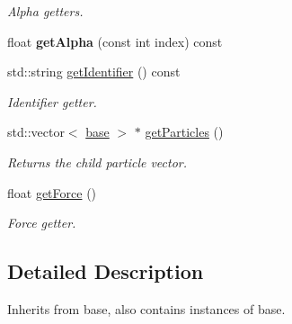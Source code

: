 \begin{DoxyCompactItemize}
\begin{DoxyCompactList}\small\item\em Alpha getters. \end{DoxyCompactList}\item 
\hypertarget{classpfx_af2cdb7ea2176235eba7a3b4af8b05ed7}{float {\bfseries get\-Alpha} (const int index) const }\label{classpfx_af2cdb7ea2176235eba7a3b4af8b05ed7}

\item 
\hypertarget{classpfx_aaa8626d7c9ec5d701fd4d953333f3473}{std\-::string \hyperlink{classpfx_aaa8626d7c9ec5d701fd4d953333f3473}{get\-Identifier} () const }\label{classpfx_aaa8626d7c9ec5d701fd4d953333f3473}

\begin{DoxyCompactList}\small\item\em Identifier getter. \end{DoxyCompactList}\item 
\hypertarget{classpfx_a2bd03654be340d4c43bb51e01c666b8a}{std\-::vector$<$ \hyperlink{classbase}{base} $>$ $\ast$ \hyperlink{classpfx_a2bd03654be340d4c43bb51e01c666b8a}{get\-Particles} ()}\label{classpfx_a2bd03654be340d4c43bb51e01c666b8a}

\begin{DoxyCompactList}\small\item\em Returns the child particle vector. \end{DoxyCompactList}\item 
\hypertarget{classpfx_a0744ef49ef96b16fa25ec417b59388c4}{float \hyperlink{classpfx_a0744ef49ef96b16fa25ec417b59388c4}{get\-Force} ()}\label{classpfx_a0744ef49ef96b16fa25ec417b59388c4}

\begin{DoxyCompactList}\small\item\em Force getter. \end{DoxyCompactList}\end{DoxyCompactItemize}


\subsection{Detailed Description}
Inherits from base, also contains instances of base. 

